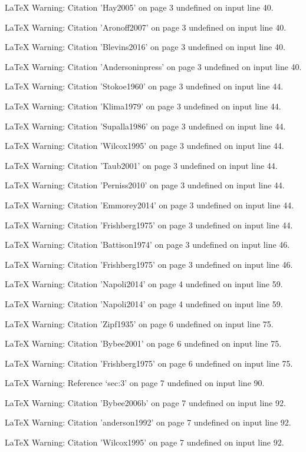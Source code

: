 LaTeX Warning: Citation 'Hay2005' on page 3 undefined on input line 40.


LaTeX Warning: Citation 'Aronoff2007' on page 3 undefined on input line 40.


LaTeX Warning: Citation 'Blevins2016' on page 3 undefined on input line 40.


LaTeX Warning: Citation 'Andersoninpress' on page 3 undefined on input line 40.


LaTeX Warning: Citation 'Stokoe1960' on page 3 undefined on input line 44.


LaTeX Warning: Citation 'Klima1979' on page 3 undefined on input line 44.


LaTeX Warning: Citation 'Supalla1986' on page 3 undefined on input line 44.


LaTeX Warning: Citation 'Wilcox1995' on page 3 undefined on input line 44.


LaTeX Warning: Citation 'Taub2001' on page 3 undefined on input line 44.


LaTeX Warning: Citation 'Perniss2010' on page 3 undefined on input line 44.


LaTeX Warning: Citation 'Emmorey2014' on page 3 undefined on input line 44.


LaTeX Warning: Citation 'Frishberg1975' on page 3 undefined on input line 44.


LaTeX Warning: Citation 'Battison1974' on page 3 undefined on input line 46.


LaTeX Warning: Citation 'Frishberg1975' on page 3 undefined on input line 46.


LaTeX Warning: Citation 'Napoli2014' on page 4 undefined on input line 59.


LaTeX Warning: Citation 'Napoli2014' on page 4 undefined on input line 59.


LaTeX Warning: Citation 'Zipf1935' on page 6 undefined on input line 75.


LaTeX Warning: Citation 'Bybee2001' on page 6 undefined on input line 75.


LaTeX Warning: Citation 'Frishberg1975' on page 6 undefined on input line 75.


LaTeX Warning: Reference `sec:3' on page 7 undefined on input line 90.


LaTeX Warning: Citation 'Bybee2006b' on page 7 undefined on input line 92.


LaTeX Warning: Citation 'anderson1992' on page 7 undefined on input line 92.


LaTeX Warning: Citation 'Wilcox1995' on page 7 undefined on input line 92.


